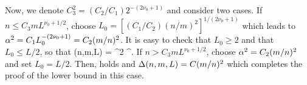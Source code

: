 Now, we denote $C_3^2 = (C_2/C_1) 2^{-(2 \nu_0 +1)}$ and consider two cases.   
If $n \leq C_3 m L^{\nu_0 + 1/2}$, choose $L_0 = [(C_1/C_2) (n/m)^2]^{1/(2 \nu_0 +1)}$ 
which leads to $\alpha^2 = C_1 L_0^{-(2 \nu_0 +1)} = C_2 (m/n)^2$.  
It is easy to check that $L_0 \geq 2$ and that $L_0 \leq L/2$, so that  
\bes 
\Del(n,m,L) =    \lkv \lkr {}\rkr^2   \rkv^{}.
\ees
If  $n > C_3 m L^{\nu_0 + 1/2}$, choose $\alpha^2 = C_2 (m/n)^2$ and set $L_0 = L/2$. Then, 
 holds and $\Delta(n,m,L) = C (m/n)^2$ which completes the proof of the lower bound
in this case. 
\\
 




 
  
